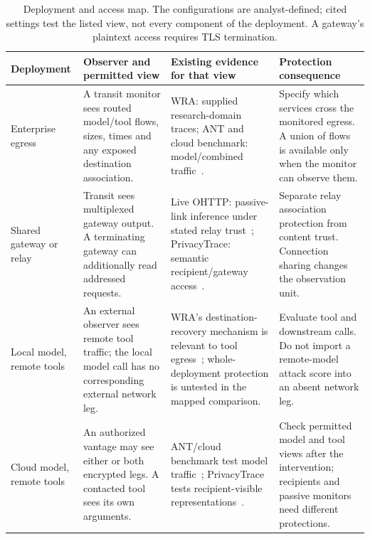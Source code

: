 \begin{table}[t]\centering\small
\caption{Deployment and access map. The configurations are analyst-defined; cited settings test the listed view, not every component of the deployment. A gateway's plaintext access requires TLS termination.}\label{tab:deployment-access}
\setlength{\tabcolsep}{4pt}
\begin{tabularx}{\textwidth}{@{}P{.18\textwidth}P{.25\textwidth}P{.28\textwidth}Y@{}}\toprule
Deployment & Observer and permitted view & Existing evidence for that view & Protection consequence \\\midrule
Enterprise egress & A transit monitor sees routed model/tool flows, sizes, times and any exposed destination association. & WRA: supplied research-domain traces; ANT and cloud benchmark: model/combined traffic~\cite{jeong2026wra,li2026ant,pouryousef2026traffic}. & Specify which services cross the monitored egress. A union of flows is available only when the monitor can observe them. \\\addlinespace[3pt]
Shared gateway or relay & Transit sees multiplexed gateway output. A terminating gateway can additionally read addressed requests. & Live OHTTP: passive-link inference under stated relay trust~\cite{dangol2026workflow}; PrivacyTrace: semantic recipient/gateway access~\cite{duan2026privacytrace}. & Separate relay association protection from content trust. Connection sharing changes the observation unit. \\\addlinespace[3pt]
Local model, remote tools & An external observer sees remote tool traffic; the local model call has no corresponding external network leg. & WRA's destination-recovery mechanism is relevant to tool egress~\cite{jeong2026wra}; whole-deployment protection is untested in the mapped comparison. & Evaluate tool and downstream calls. Do not import a remote-model attack score into an absent network leg. \\\addlinespace[3pt]
Cloud model, remote tools & An authorized vantage may see either or both encrypted legs. A contacted tool sees its own arguments. & ANT/cloud benchmark test model traffic~\cite{li2026ant,pouryousef2026traffic}; PrivacyTrace tests recipient-visible representations~\cite{duan2026privacytrace}. & Check permitted model and tool views after the intervention; recipients and passive monitors need different protections. \\\bottomrule
\end{tabularx}
\end{table}
